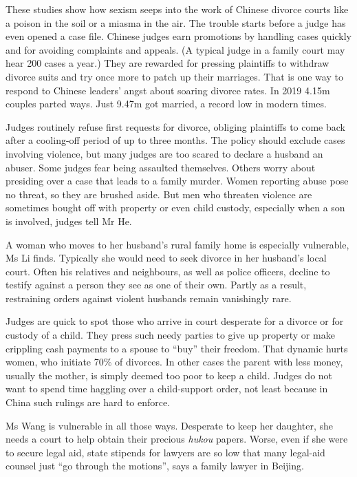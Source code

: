 \documentclass{article}
\begin{document}
These studies show how sexism seeps into the work of Chinese divorce courts like a poison in the soil or a miasma in the air. The trouble starts before a judge has even opened a case file. Chinese judges earn promotions by handling cases quickly and for avoiding complaints and appeals. (A typical judge in a family court may hear 200 cases a year.) They are rewarded for pressing plaintiffs to withdraw divorce suits and try once more to patch up their marriages. That is one way to respond to Chinese leaders' angst about soaring divorce rates. In 2019 4.15m couples parted ways. Just 9.47m got married, a record low in modern times. 

Judges routinely refuse first requests for divorce, obliging plaintiffs to come back after a cooling-off period of up to three months. The policy should exclude cases involving violence, but many judges are too scared to declare a husband an abuser. Some judges fear being assaulted themselves. Others worry about presiding over a case that leads to a family murder. Women reporting abuse pose no threat, so they are brushed aside. But men who threaten violence are sometimes bought off with property or even child custody, especially when a son is involved, judges tell Mr He. 

A woman who moves to her husband's rural family home is especially vulnerable, Ms Li finds. Typically she would need to seek divorce in her husband's local court. Often his relatives and neighbours, as well as police officers, decline to testify against a person they see as one of their own. Partly as a result, restraining orders against violent husbands remain vanishingly rare. 

Judges are quick to spot those who arrive in court desperate for a divorce or for custody of a child. They press such needy parties to give up property or make crippling cash payments to a spouse to ``buy'' their freedom. That dynamic hurts women, who initiate 70\% of divorces. In other cases the parent with less money, usually the mother, is simply deemed too poor to keep a child. Judges do not want to spend time haggling over a child-support order, not least because in China such rulings are hard to enforce. 

Ms Wang is vulnerable in all those ways. Desperate to keep her daughter, she needs a court to help obtain their precious \emph{hukou} papers. Worse, even if she were to secure legal aid, state stipends for lawyers are so low that many legal-aid counsel just ``go through the motions'', says a family lawyer in Beijing. 
\end{document}
